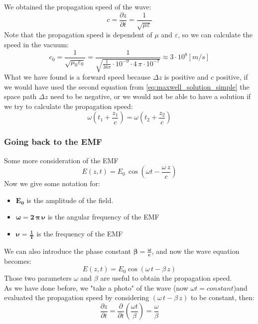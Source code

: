 We obtained the propagation speed of the wave:
\begin{equation}
    c=\frac{\partial z}{\partial t}=\frac{1}{\sqrt{\mu \varepsilon}}
\end{equation}
Note that the propagation speed is dependent of $\mu$ and $\varepsilon$, so we can calculate the speed in the vacuum:
\begin{equation}
    c_0=\frac{1}{\sqrt{\mu_0 \varepsilon_0}}=\frac{1}{\sqrt{\frac{1}{36\pi}\cdot 10^{-9}\cdot 4\,\pi\cdot 10^{-7}}}\approx 3\cdot 10^{8}[m/s]
\end{equation}
What we have found is a forward speed because $\Delta z$ is positive and $c$ positive, if we would have used the second equation from \cref{eq:maxwell_solution_simple} the space path $\Delta z$ need to be negative, or we would not be able to have a solution if we try to calculate the propagation speed:
\begin{equation}
    \omega\left(t_1+\frac{z_1}{c}\right)=\omega\left(t_2+\frac{z_2}{c}\right)
\end{equation}
\subsubsection*{Going back to the EMF}
Some more consideration of the EMF
\begin{equation}
    E(z,t)=E_0\,\cos(\omega t-\frac{\omega\,z}{c})
\end{equation}
Now we give some notation for:
\begin{itemize}
    \item $\bm{E_0}$ is the amplitude of the field.
    \item $\bm{\omega=2\,\pi\,\nu } $ is the angular frequency of the EMF
    \item $\bm{\nu =\frac{1}{T}}$ is the frequency of the EMF
\end{itemize}
We can also introduce the phase constant $\bm{\beta=\frac{\omega}{c}}$, and now the wave equation becomes:
\begin{equation}\label{eq:E_with_phase_constant}
    E(z,t)=E_0\cos(\omega\, t-\beta\,z)
\end{equation}
Those two parameters $\omega$ and $\beta$ are useful to obtain the propagation speed.\\
As we have done before, we "take a photo" of the wave (now $\omega t=constant$)and evaluated the propagation speed by considering $(\omega \,t-\beta \,z)$ to be constant, then:
\begin{equation}\label{eq:speed_of_EMF}
    \frac{\partial z}{\partial t}= \frac{\partial }{\partial t}\left(\frac{\omega t}{\beta}\right) = \frac{\omega}{\beta}
\end{equation}
